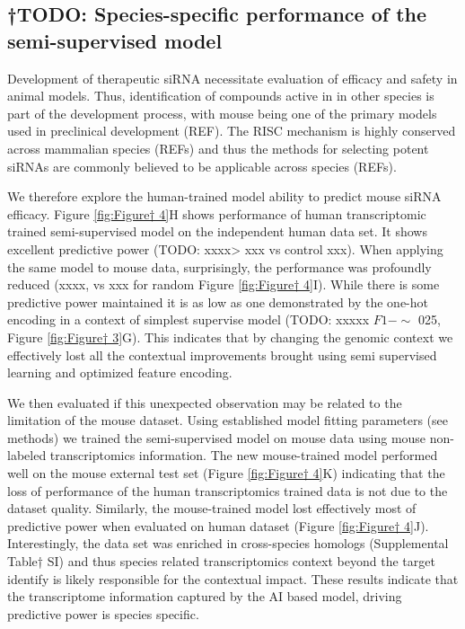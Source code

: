 \documentclass{report}
\begin{document}
\subsection{†TODO: Species-specific performance of the semi-supervised model}
Development of therapeutic siRNA necessitate evaluation of efficacy and safety in animal models. Thus, identification of compounds active in in other species is part of the development process, with mouse being one of the primary models used in preclinical development (REF). The RISC mechanism is highly conserved across mammalian species (REFs) and thus the methods for selecting potent siRNAs are commonly believed to be applicable across species (REFs). 

We therefore explore the human-trained model ability to predict mouse siRNA efficacy. Figure \ref{fig:Figure† 4}H shows performance of human transcriptomic trained semi-supervised model on the independent human data set. It shows excellent predictive power (TODO: xxxx> xxx vs control xxx). When applying the same model to mouse data, surprisingly, the performance was profoundly reduced (xxxx, vs xxx for random Figure \ref{fig:Figure† 4}I). While there is some predictive power maintained it is as low as one demonstrated by the one-hot encoding in a context of simplest supervise model (TODO: xxxxx $F1-\sim$ 025, Figure \ref{fig:Figure† 3}G). This indicates that by changing the genomic context we effectively lost all the contextual improvements brought using semi supervised learning and optimized feature encoding.

We then evaluated if this unexpected observation may be related to the limitation of the mouse dataset. Using established model fitting parameters (see methods) we trained the semi-supervised model on mouse data using mouse non-labeled transcriptomics information. The new mouse-trained model performed well on the mouse external test set (Figure \ref{fig:Figure† 4}K) indicating that the loss of performance of the human transcriptomics trained data is not due to the dataset quality. Similarly, the mouse-trained model lost effectively most of predictive power when evaluated on human dataset (Figure \ref{fig:Figure† 4}J).  Interestingly, the data set was enriched in cross-species homologs (Supplemental Table† SI) and thus species related transcriptomics context beyond the target identify is likely responsible for the contextual impact. These results indicate that the transcriptome information captured by the AI based model, driving predictive power is species specific. 
\end{document}
